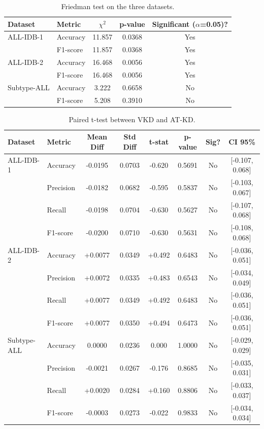 \documentclass[preprint,review,12pt]{elsarticle}
\begin{document}
\begin{table}[tbp]
\centering
\caption{Friedman test on the three datasets.}
\label{tab:friedman}
\footnotesize
\renewcommand{\arraystretch}{1.2}
\setlength{\tabcolsep}{3pt}
\begin{tabular}{l l c c c}
\toprule
\textbf{Dataset} & \textbf{Metric} & $\chi^{2}$ & \textbf{p-value} & \textbf{Significant (}$\alpha$\textbf{=0.05)?} \\
\midrule
ALL-IDB-1 & Accuracy & 11.857 & 0.0368 & Yes \\
 & F1-score & 11.857 & 0.0368 & Yes \\
ALL-IDB-2 & Accuracy & 16.468 & 0.0056 & Yes \\
 & F1-score & 16.468 & 0.0056 & Yes \\
Subtype-ALL & Accuracy & 3.222 & 0.6658 & No \\
 & F1-score & 5.208 & 0.3910 & No \\
\bottomrule
\end{tabular}
\end{table}
\begin{table}[tbp]
\centering
\caption{Paired t-test between VKD and AT-KD.}
\label{tab:ttest}
\footnotesize
\renewcommand{\arraystretch}{1.2}
\setlength{\tabcolsep}{3pt}
\begin{tabular}{l l c c c c c c}
\toprule
\textbf{Dataset} & \textbf{Metric} & \textbf{Mean Diff} & \textbf{Std Diff} & \textbf{t-stat} & \textbf{p-value} & \textbf{Sig?} & \textbf{CI 95\%} \\
\midrule
ALL-IDB-1 & Accuracy & -0.0195 & 0.0703 & -0.620 & 0.5691 & No & [-0.107, 0.068] \\
 & Precision & -0.0182 & 0.0682 & -0.595 & 0.5837 & No & [-0.103, 0.067] \\
 & Recall & -0.0198 & 0.0704 & -0.630 & 0.5627 & No & [-0.107, 0.068] \\
 & F1-score & -0.0200 & 0.0710 & -0.630 & 0.5631 & No & [-0.108, 0.068] \\
ALL-IDB-2 & Accuracy & +0.0077 & 0.0349 & +0.492 & 0.6483 & No & [-0.036, 0.051] \\
 & Precision & +0.0072 & 0.0335 & +0.483 & 0.6543 & No & [-0.034, 0.049] \\
 & Recall & +0.0077 & 0.0349 & +0.492 & 0.6483 & No & [-0.036, 0.051] \\
 & F1-score & +0.0077 & 0.0350 & +0.494 & 0.6473 & No & [-0.036, 0.051] \\
Subtype-ALL & Accuracy & 0.0000 & 0.0236 & 0.000 & 1.0000 & No & [-0.029, 0.029] \\
 & Precision & -0.0021 & 0.0267 & -0.176 & 0.8685 & No & [-0.035, 0.031] \\
 & Recall & +0.0020 & 0.0284 & +0.160 & 0.8806 & No & [-0.033, 0.037] \\
 & F1-score & -0.0003 & 0.0273 & -0.022 & 0.9833 & No & [-0.034, 0.034] \\
\bottomrule
\end{tabular}
\end{table}
\end{document}
